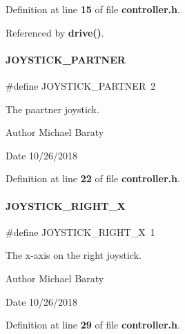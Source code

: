 Definition at line \textbf{ 15} of file \textbf{ controller.\+h}.



Referenced by \textbf{ drive()}.

\mbox{\label{controller_8h_acb72797a31fa698cd776802ad9aa536f}} 
\paragraph{J\+O\+Y\+S\+T\+I\+C\+K\+\_\+\+P\+A\+R\+T\+N\+ER}
{\footnotesize\ttfamily \#define J\+O\+Y\+S\+T\+I\+C\+K\+\_\+\+P\+A\+R\+T\+N\+ER~2}



The paartner joystick. 

\begin{DoxyAuthor}{Author}
Michael Baraty 
\end{DoxyAuthor}
\begin{DoxyDate}{Date}
10/26/2018 
\end{DoxyDate}


Definition at line \textbf{ 22} of file \textbf{ controller.\+h}.

\mbox{\label{controller_8h_a403e767d53da881973f4abbb1b55559b}} 
\paragraph{J\+O\+Y\+S\+T\+I\+C\+K\+\_\+\+R\+I\+G\+H\+T\+\_\+X}
{\footnotesize\ttfamily \#define J\+O\+Y\+S\+T\+I\+C\+K\+\_\+\+R\+I\+G\+H\+T\+\_\+X~1}



The x-\/axis on the right joystick. 

\begin{DoxyAuthor}{Author}
Michael Baraty 
\end{DoxyAuthor}
\begin{DoxyDate}{Date}
10/26/2018 
\end{DoxyDate}


Definition at line \textbf{ 29} of file \textbf{ controller.\+h}.



